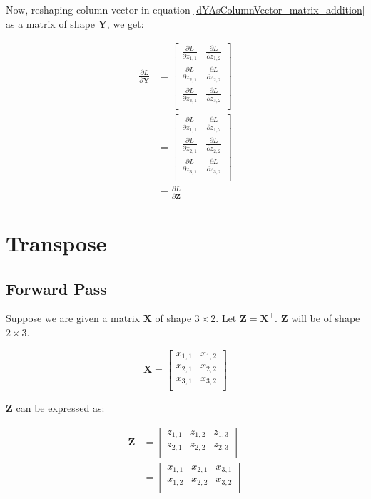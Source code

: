 \documentclass{article}
\newcommand{\transpose}[1]{#1^\top}
\newcommand{\matr}[1]{\mathbf{#1}} %
\begin{document}
Now, reshaping column vector in equation \ref{dYAsColumnVector_matrix_addition} as a matrix of shape $\matr{Y}$, we get:

\begin{align}
\frac{\partial L}{\partial \matr{Y}} &=
\begin{bmatrix}
\frac{\partial L}{\partial z_{1,1}} &
\frac{\partial L}{\partial z_{1,2}} \\[0.7em]
\frac{\partial L}{\partial z_{2,1}} &
\frac{\partial L}{\partial z_{2,2}} \\[0.7em]
\frac{\partial L}{\partial z_{3,1}} &
\frac{\partial L}{\partial z_{3,2}} \\[0.7em]
\end{bmatrix}
\nonumber \\
&=
\begin{bmatrix}
\frac{\partial L}{\partial z_{1,1}} & \frac{\partial L}{\partial z_{1,2}} \\[0.5em]
\frac{\partial L}{\partial z_{2,1}} & \frac{\partial L}{\partial z_{2,2}} \\[0.5em]
\frac{\partial L}{\partial z_{3,1}} & \frac{\partial L}{\partial z_{3,2}} \\[0.5em]
\end{bmatrix}
\nonumber \\
&=
\frac{\partial L}{\partial \matr{Z}}
\end{align}

\section{Transpose}
\subsection{Forward Pass}
Suppose we are given a matrix $\matr{X}$ of shape $3 \times 2$. Let $\matr{Z} = \transpose{\matr{X}}$. $\matr{Z}$ will be of shape $2 \times 3$.

\begin{displaymath}
\matr{X} =
\begin{bmatrix}
x_{1,1} & x_{1,2} \\%
x_{2,1} & x_{2,2} \\%
x_{3,1} & x_{3,2} \\%
\end{bmatrix}
\end{displaymath}

$\matr{Z}$ can be expressed as:

\begin{align}
\matr{Z} &=
\begin{bmatrix}
z_{1,1} & z_{1,2} & z_{1,3}\\%
z_{2,1} & z_{2,2} & z_{2,3}\\%
\end{bmatrix}
\nonumber \\
&=
\begin{bmatrix}
x_{1,1} & x_{2,1} & x_{3,1} \\%
x_{1,2} & x_{2,2} & x_{3,2} \\%
\end{bmatrix}
\end{align}
\end{document}
